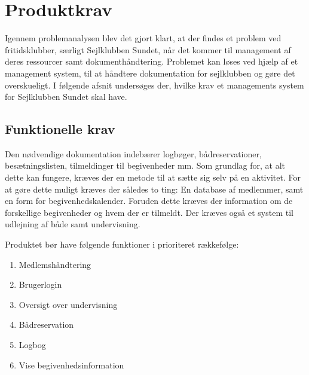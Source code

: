 \chapter{Produktkrav}

Igennem problemanalysen blev det gjort klart, at der findes et problem ved fritidsklubber, særligt Sejlklubben Sundet, når det kommer til management af deres ressourcer samt dokumenthåndtering. 
Problemet kan løses ved hjælp af et management system, til at håndtere dokumentation for sejlklubben og gøre det overskueligt. 
I følgende afsnit undersøges der, hvilke krav et managements system for Sejlklubben Sundet skal have. 


\section{Funktionelle krav} \label{sec:funktionelleKrav}

Den nødvendige dokumentation indebærer logbøger, bådreservationer, besætningslisten, tilmeldinger til begivenheder mm. 
Som grundlag for, at alt dette kan fungere, kræves der en metode til at sætte sig selv på en aktivitet. 
For at gøre dette muligt kræves der således to ting: En database af medlemmer, samt en form for begivenhedskalender.
Foruden dette kræves der information om de forskellige begivenheder og hvem der er tilmeldt. 
Der kræves også et system til udlejning af både samt undervisning.

Produktet bør have følgende funktioner i prioriteret rækkefølge:
\begin{enumerate}
  \item Medlemshåndtering
  \item Brugerlogin
  \item Oversigt over undervisning 
  \item Bådreservation
  \item Logbog
  \item Vise begivenhedsinformation 
\end{enumerate}


